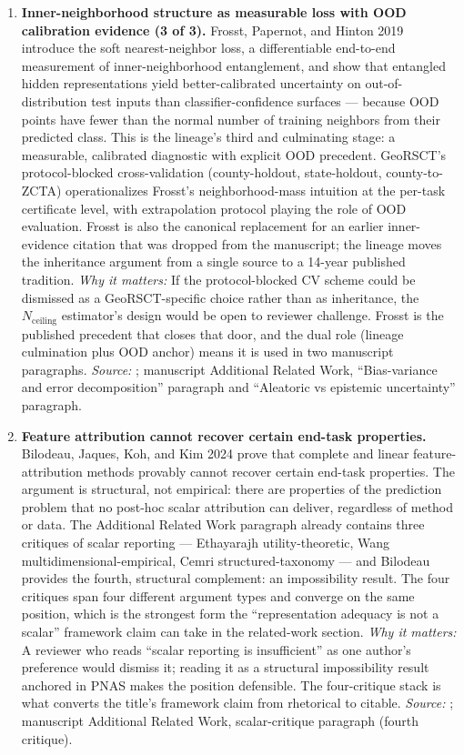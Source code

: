 \documentclass{article}
\begin{document}
\begin{enumerate}
\item \textbf{Inner-neighborhood structure as measurable loss with OOD calibration evidence (3 of 3).}
Frosst, Papernot, and Hinton 2019 introduce the soft nearest-neighbor loss, a differentiable end-to-end measurement of inner-neighborhood entanglement, and show that entangled hidden representations yield better-calibrated uncertainty on out-of-distribution test inputs than classifier-confidence surfaces --- because OOD points have fewer than the normal number of training neighbors from their predicted class. This is the lineage's third and culminating stage: a measurable, calibrated diagnostic with explicit OOD precedent. GeoRSCT's protocol-blocked cross-validation (county-holdout, state-holdout, county-to-ZCTA) operationalizes Frosst's neighborhood-mass intuition at the per-task certificate level, with extrapolation protocol playing the role of OOD evaluation. Frosst is also the canonical replacement for an earlier inner-evidence citation that was dropped from the manuscript; the lineage moves the inheritance argument from a single source to a 14-year published tradition.
\emph{Why it matters:} If the protocol-blocked CV scheme could be dismissed as a GeoRSCT-specific choice rather than as inheritance, the $N_{\text{ceiling}}$ estimator's design would be open to reviewer challenge. Frosst is the published precedent that closes that door, and the dual role (lineage culmination plus OOD anchor) means it is used in two manuscript paragraphs.
\emph{Source:} \citet{frosst2019analyzing}; manuscript Additional Related Work, ``Bias-variance and error decomposition'' paragraph and ``Aleatoric vs epistemic uncertainty'' paragraph.

\item \textbf{Feature attribution cannot recover certain end-task properties.}
Bilodeau, Jaques, Koh, and Kim 2024 prove that complete and linear feature-attribution methods provably cannot recover certain end-task properties. The argument is structural, not empirical: there are properties of the prediction problem that no post-hoc scalar attribution can deliver, regardless of method or data. The Additional Related Work paragraph already contains three critiques of scalar reporting --- Ethayarajh utility-theoretic, Wang multidimensional-empirical, Cemri structured-taxonomy --- and Bilodeau provides the fourth, structural complement: an impossibility result. The four critiques span four different argument types and converge on the same position, which is the strongest form the ``representation adequacy is not a scalar'' framework claim can take in the related-work section.
\emph{Why it matters:} A reviewer who reads ``scalar reporting is insufficient'' as one author's preference would dismiss it; reading it as a structural impossibility result anchored in PNAS makes the position defensible. The four-critique stack is what converts the title's framework claim from rhetorical to citable.
\emph{Source:} \citet{bilodeau2024impossibility}; manuscript Additional Related Work, scalar-critique paragraph (fourth critique).


\end{enumerate}
\end{document}

